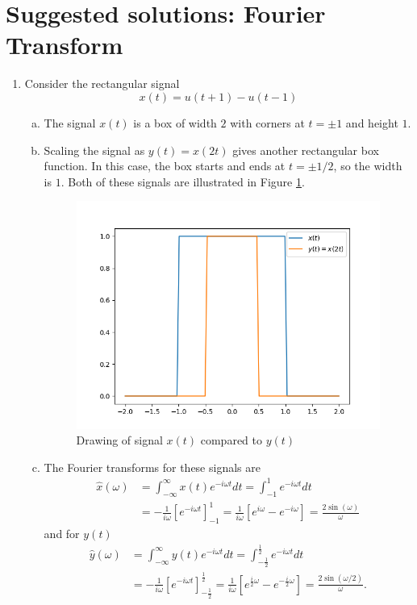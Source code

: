 \newpage
\section{Suggested solutions: Fourier Transform}
\begin{enumerate}
\item Consider the rectangular signal 
$$x(t)=u(t+1)-u(t-1)$$

\begin{enumerate}[a)]
\item The signal $x(t)$ is a box of width $2$ with corners at $t=\pm 1$ and height $1$. 

\item Scaling the signal as $y(t)=x(2t)$ gives another rectangular box function. In this case, the box starts and ends at $t=\pm 1/2$, so the width is $1$. Both of these signals are illustrated in Figure \ref{fig:ex8.1a}.

\begin{figure}
    \centering
    \includegraphics{ch08/figures/fig:ex8.1a.png}
    \caption{Drawing of signal $x(t)$ compared to $y(t)$}
    \label{fig:ex8.1a}
\end{figure}

\item The Fourier transforms for these signals are
\begin{align*}
    \hat{x}(\omega)&=\int_{-\infty}^{\infty}x(t)e^{-i\omega t}dt=\int_{-1}^{1}e^{-i\omega t}dt  \\
    &=-\frac{1}{i\omega}[e^{-i\omega t}]_{-1}^{1}=\frac{1}{i\omega}\left[e^{i\omega}-e^{-i\omega}\right]=\frac{2\sin(\omega)}{\omega}
\end{align*}
and for $y(t)$
\begin{align*}
    \hat{y}(\omega)&=\int_{-\infty}^{\infty}y(t)e^{-i\omega t}dt=\int_{-\frac{1}{2}}^{\frac{1}{2}}e^{-i\omega t}dt  \\
    &=-\frac{1}{i\omega}[e^{-i\omega t}]_{-\frac{1}{2}}^{\frac{1}{2}}=\frac{1}{i\omega}\left[e^{\frac{i}{2}\omega}-e^{-\frac{i}{2}\omega}\right]=\frac{2\sin(\omega/2)}{\omega}.
\end{align*}


\end{enumerate}
\end{enumerate}

